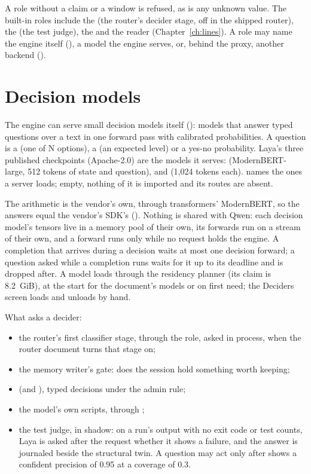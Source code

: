 A role without a claim or a window is refused, as is any unknown value. The built-in roles include the  (the router's decider stage, off in the shipped router), the  (the test judge), the  and the  reader (Chapter~\ref{ch:lines}). A role may name the engine itself (), a model the engine serves, or, behind the proxy, another backend ().

\section{Decision models}\label{sec:deciders}

The engine can serve small decision models itself (): models that answer typed questions over a text in one forward pass with calibrated probabilities. A question is a  (one of N options), a  (an expected level) or a yes-no probability. Laya's three published checkpoints (Apache-2.0) are the models it serves:  (ModernBERT-large, 512 tokens of state and question),  and  (1,024 tokens each).  names the ones a server loads; empty, nothing of it is imported and its routes are absent.

The arithmetic is the vendor's own, through transformers' ModernBERT, so the answers equal the vendor's SDK's (). Nothing is shared with Qwen: each decision model's tensors live in a memory pool of their own, its forwards run on a stream of their own, and a forward runs only while no request holds the engine. A completion that arrives during a decision waits at most one decision forward; a question asked while a completion runs waits for it up to its deadline and is dropped after. A model loads through the residency planner (its claim is 8.2~GiB), at the start for the  document's  models or on first need; the Deciders screen loads and unloads by hand.

What asks a decider:

\begin{itemize}
\item the router's first classifier stage, through the  role, asked in process, when the router document turns that stage on;
\item the memory writer's gate: does the session hold something worth keeping;
\item {} (and ), typed decisions under the admin rule;
\item the model's own scripts, through ;
\item the test judge, in shadow: on a run's output with no exit code or test counts, Laya is asked after the request whether it shows a failure, and the answer is journaled beside the structural twin. A question may act only after  shows a confident precision of 0.95 at a coverage of 0.3.
\end{itemize}

